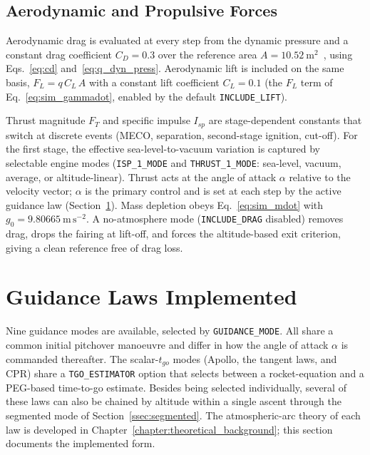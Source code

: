 \subsection{Aerodynamic and Propulsive Forces}
\label{ssec:aero_prop}

Aerodynamic drag is evaluated at every step from the dynamic pressure and a
constant drag coefficient $C_D=0.3$ over the reference area
$A=10.52~\mathrm{m^{2}}$~\cite{NASA_Falcon9v12_Datasheet_2018}, using
Eqs.~\eqref{eq:cd} and~\eqref{eq:q_dyn_press}. Aerodynamic lift is included on the
same basis, $F_L = q\,C_L\,A$ with a constant lift coefficient $C_L=0.1$ (the $F_L$
term of Eq.~\eqref{eq:sim_gammadot}, enabled by the default \texttt{INCLUDE\_LIFT}).

Thrust magnitude $F_T$ and specific impulse $I_{sp}$ are stage-dependent
constants that switch at discrete events (MECO, separation, second-stage
ignition, cut-off). For the first stage, the effective sea-level-to-vacuum
variation is captured by selectable engine modes (\texttt{ISP\_1\_MODE} and
\texttt{THRUST\_1\_MODE}: sea-level, vacuum, average, or altitude-linear). Thrust
acts at the angle of attack $\alpha$ relative to the velocity vector; $\alpha$ is
the primary control and is set at each step by the active guidance law
(Section~\ref{sec:guidance}). Mass depletion obeys Eq.~\eqref{eq:sim_mdot} with
$g_0=9.80665~\mathrm{m\,s^{-2}}$. A no-atmosphere mode (\texttt{INCLUDE\_DRAG}
disabled) removes drag, drops the fairing at lift-off, and forces the
altitude-based exit criterion, giving a clean reference free of drag loss.

\section{Guidance Laws Implemented}
\label{sec:guidance}

Nine guidance modes are available, selected by \texttt{GUIDANCE\_MODE}. All share
a common initial pitchover manoeuvre and differ in how the angle of attack
$\alpha$ is commanded thereafter. The scalar-$t_{go}$ modes (Apollo, the tangent
laws, and CPR) share a \texttt{TGO\_ESTIMATOR} option that selects between a
rocket-equation and a PEG-based time-to-go estimate. Besides being selected
individually, several of these laws can also be chained by altitude within a single
ascent through the segmented mode of Section~\ref{ssec:segmented}. The
atmospheric-arc theory of each law is developed in
Chapter~\ref{chapter:theoretical_background}; this section documents the
implemented form.

